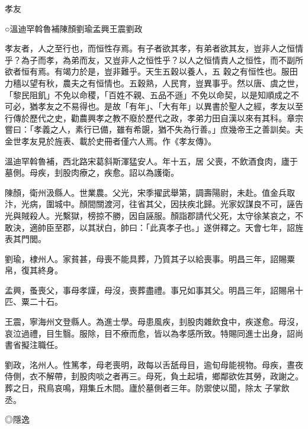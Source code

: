 
\begin{pinyinscope}

 孝友



 ○溫迪罕斡魯補陳顏劉瑜孟興王震劉政



 孝友者，人之至行也，而恒性存焉。有子者欲其孝，有弟者欲其友，豈非人之恒情乎？為子而孝，為弟而友，又豈非人之恒性乎？以人之恒情責人之恒性，而不副所欲者恒有焉。有竭力於是，豈非難乎。天生五穀以養人，五
 穀之有恒性也。服田力穡以望有秋，農夫之有恒情也。五穀熟，人民育，豈異事乎。然以唐、虞之世，「黎民阻飢」不免以命稷，「百姓不親、五品不遜」不免以命契，以是知順成之不可必，猶孝友之不易得也。是故「有年」、「大有年」以異書於聖人之經，孝友以至行傳於歷代之史，勸農興孝之教不廢於歷代之政，孝弟力田自漢以來有其科。章宗嘗曰：「孝義之人，素行已備，雖有希覬，猶不失為行善。」庶幾帝王之善訓矣。夫金世孝友見於旌表、載於史冊者僅六人焉。作《孝友傳》。



 溫迪罕斡魯補，西北路宋葛斜斯渾猛安人。年十五，居
 父喪，不飲酒食肉，廬于墓側。母疾，刲股肉療之，疾愈。詔以為護衛。



 陳顏，衛州汲縣人。世業農。父光，宋季擢武舉第，調壽陽尉，未赴。值金兵取汴，光病，圍城中。顏間關渡河，往省其父，因扶疾北歸。光家奴謀良不可，誣告光與賊殺人。光繫獄，榜掠不勝，因自誣服。顏詣郡請代父死，太守徐某哀之，不敢決，適帥臣至郡，以其狀白，帥曰：「此真孝子也。」遂併釋之。天會七年，詔旌表其門閭。



 劉瑜，棣州人。家貧甚，母喪不能具葬，乃質其子以給喪事。明昌三年，詔賜粟帛，復其終身。



 孟興，蚤喪父，事母孝謹，母沒，喪葬盡禮。事兄如事其父。明昌三年，詔賜帛十匹、粟二十石。



 王震，寧海州文登縣人。為進士學。母患風疾，刲股肉雜飲食中，疾遂愈。母沒，哀泣過禮，目生翳。服除，目不療而愈，皆以為孝感所致。特賜同進士出身，詔尚書省擬注職任。



 劉政，洺州人。性篤孝，母老喪明，政每以舌舐母目，逾旬母能視物。母疾，晝夜侍側，衣不解帶，刲股肉啖之者再三。母死，負土起墳，鄉鄰欲佐其勞，政謝之。葬之日，飛鳥哀鳴，翔集丘木間。廬於墓側者三年。防禦使以聞，除太
 子掌飲丞。



 ◎隱逸




\end{pinyinscope}
